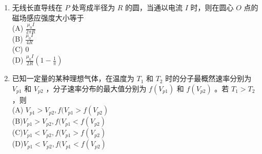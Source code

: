 \begin{enumerate}
(D)$\displaystyle E=0,\qquad U=\frac{Q}{4 \pi \varepsilon_0 R_2}$
\item 无线长直导线在 $P$ 处弯成半径为 $R$ 的圆，当通以电流 $I$ 时，则在圆心  $O$ 点的磁场感应强度大小等于\\
(A) $\displaystyle \frac{\mu_0 I}{2 \pi R}$\\
(B) $\displaystyle \frac{\mu_0 I}{4R}$\\
(C) $0$\\
(D) $\displaystyle \frac{\mu_0 I}{2R}(1-\frac{1}{\pi})$
\item 已知一定量的某种理想气体，在温度为 $T_1$ 和 $T_2$ 时的分子最概然速率分别为 $V_{p1}$ 和 $V_{p2}$ ，分子速率分布的最大值分别为 $f(V_{p1})$ 和 $f(V_{p2})$ 。若 $T_1>T_2$ ，则\\
(A) $V_{p1}>V_{p2},f(V_{p1}>f(V_{p2})$\\
(B)$V_{p1}>V_{p2},f(V_{p1}<f(V_{p2})$\\
(C)$V_{p1}<V_{p2},f(V_{p1}>f(V_{p2})$\\
(D)$V_{p1}<V_{p2},f(V_{p1}<f(V_{p2})$\\

\end{enumerate}
